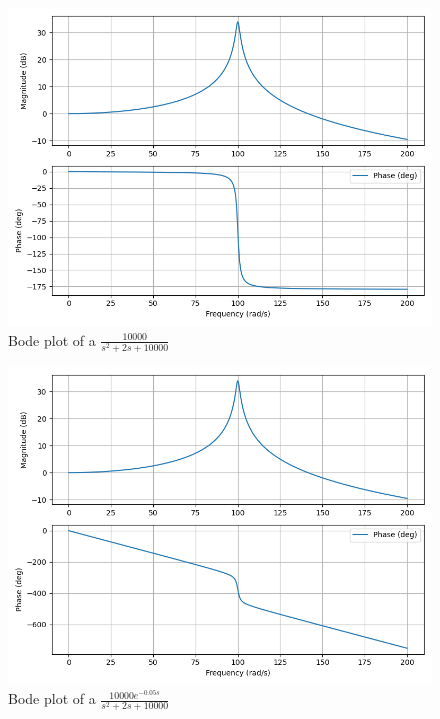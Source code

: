 \documentclass[journal,12pt,onecolumn]{IEEEtran}
\theoremstyle{remark}
\begin{document}
\begin{figure}[h]
    \centering
    \includegraphics[width=\linewidth]{figs/A.png}
    \caption{Bode plot of a $\frac{10000}{s^2+2s+10000}$}
\end{figure}
\begin{figure}[h]
    \centering
    \includegraphics[width=\linewidth]{figs/B.png}
    \caption{Bode plot of a $\frac{10000e^{-0.05s}}{s^2+2s+10000}$}
\end{figure}
\end{document}
